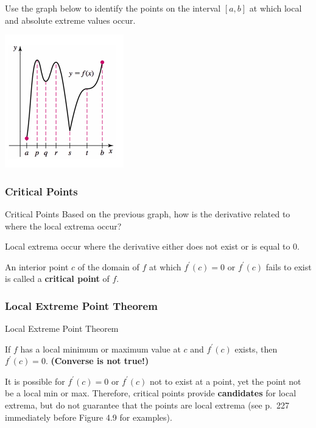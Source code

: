 \documentclass[cal1spr16Lectures.tex]{subfiles}
\begin{document}
\begin{frame}
\frametitle{}
\small
\begin{exe} Use the graph below to identify the points on the interval $[a,b]$ at which local and absolute extreme values occur.
\begin{center}
\includegraphics[scale=0.9]{pictures/Ch4Sect1_Prob16}
\end{center}
\end{exe}
\end{frame}

\subsubsection{Critical Points}

\begin{frame}{\small Critical Points}
Based on the previous graph, how is the derivative related to where the local extrema occur?

\vspace{1pc}
Local extrema occur where the derivative either does not exist or is equal to 0.

\begin{dfn} An interior point $c$ of the domain of $f$ at which $f^{\prime}(c)=0$ or $f^{\prime}(c)$ fails to exist is called a {\bf critical point} of $f$. \end{dfn}
\end{frame}

\subsubsection{Local Extreme Point Theorem}

\begin{frame}{\small Local Extreme Point Theorem}
\small
\begin{thm} If $f$ has a local minimum or maximum value at $c$ and $f^{\prime}(c)$ exists, then $f^{\prime}(c)=0$.  \alert{\bf (Converse is not true!)} \end{thm}

It is possible for $f^{\prime}(c)=0$ or $f^{\prime}(c)$ not to exist at a point, yet the point not be a local min or max.  Therefore, critical points provide {\bf candidates} for local extrema, but do not guarantee that the points are local extrema (see p.\ 227 immediately before Figure 4.9 for examples).
\end{frame}
\end{document}
